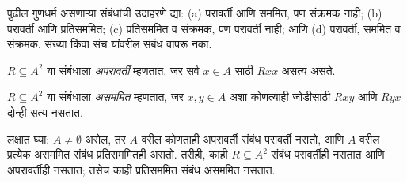 \documentclass[../../../include/open-logic-section]{subfiles}
\begin{document}
\begin{prob}
पुढील गुणधर्म असणाऱ्या संबंधांची उदाहरणे द्या: (a) परावर्ती आणि सममित,
पण संक्रमक नाही; (b) परावर्ती आणि प्रतिसममित; (c) प्रतिसममित व संक्रमक,
पण परावर्ती नाही; आणि (d) परावर्ती, सममित व संक्रमक. संख्या किंवा संच
यांवरील संबंध वापरू नका.
\end{prob}

\begin{defn}[अपरावर्तिता]
$R \subseteq A^2$ या संबंधाला \emph{अपरावर्ती} म्हणतात, जर सर्व $x \in A$
साठी $Rxx$ असत्य असते.
\end{defn}

\begin{defn}[असममिती]
$R \subseteq A^2$ या संबंधाला \emph{असममित} म्हणतात, जर $x,y\in A$ अशा
कोणत्याही जोडीसाठी $Rxy$ आणि $Ryx$ दोन्ही सत्य नसतात.
\end{defn}

लक्षात घ्या: $A \neq \emptyset$ असेल, तर $A$ वरील कोणताही अपरावर्ती
संबंध परावर्ती नसतो, आणि $A$ वरील प्रत्येक असममित संबंध प्रतिसममितही
असतो. तरीही, काही $R \subseteq A^2$ संबंध परावर्तीही नसतात आणि
अपरावर्तीही नसतात; तसेच काही प्रतिसममित संबंध असममित नसतात.
\end{document}
